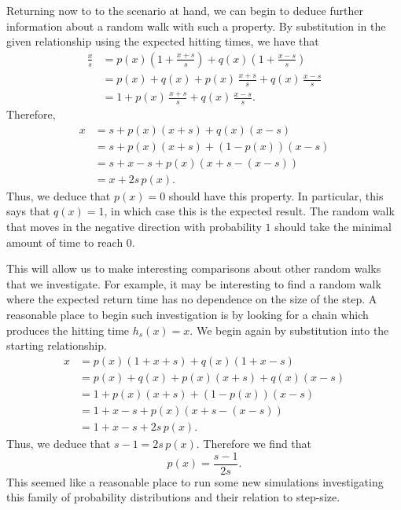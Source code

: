 Returning now to to the scenario at hand, we can begin to deduce further information about a random walk
with such a property. By substitution in the given relationship using the expected hitting times, we
have that
\begin{align*}
    \frac{x}{s} &= p(x)\left(1 + \frac{x+s}{s}\right) + q(x)\left(1 + \frac{x-s}{s}\right)\\
                &= p(x) + q(x) + p(x)\, \frac{x+s}{s} + q(x) \, \frac{x-s}{s} \\
                &= 1 + p(x)\, \frac{x+s}{s} + q(x) \, \frac{x-s}{s}.
\end{align*}
Therefore,
\begin{align*}
    x &= s + p(x)(x+s) + q(x)(x-s) \\
      &= s + p(x)(x+s) + (1-p(x))(x-s) \\
      &= s + x - s + p(x)(x + s - (x - s)) \\
      &= x + 2s\, p(x).
\end{align*}
Thus, we deduce that $p(x) = 0$ should have this property. In particular, this says that $q(x) = 1$, in
which case this is the expected result. The random walk that moves in the negative direction with
probability $1$ should take the minimal amount of time to reach $0$.

This will allow us to make interesting comparisons about other random walks that we investigate. For
example, it may be interesting to find a random walk where the expected return time has no dependence on
the size of the step. A reasonable place to begin such investigation is by looking for a chain which
produces the hitting time $h_s(x) = x$. We begin again by substitution into the starting relationship.
\begin{align*}
    x &= p(x)(1 + x + s) + q(x)(1 + x - s) \\
      &= p(x) + q(x) + p(x)(x+s) + q(x)(x-s) \\
      &= 1 + p(x)(x+s) + (1-p(x))(x-s) \\
      &= 1 + x - s + p(x)(x+s - (x - s)) \\
      &= 1 + x - s + 2s\, p(x).
\end{align*}
Thus, we deduce that $s - 1 = 2s\, p(x)$. Therefore we find that
\[
    p(x) = \frac{s-1}{2s}.
\]
This seemed like a reasonable place to run some new simulations investigating this family of probability
distributions and their relation to step-size.

